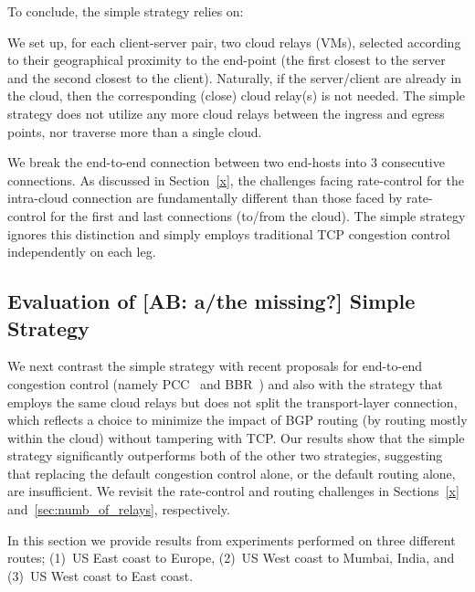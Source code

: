 \documentclass[10pt,sigconf]{acmart}
\newcommand{\mycomm}[3]{{\color{#2} \textbf{[#1: #3]}}}
\newcommand{\mycomm}[3]{}
\newcommand{\AB}[1]{\mycomm{AB}{orange}{#1}}
\begin{document}
To conclude, the simple strategy relies on:

\vspace{0.1in} We set up, for each client-server pair, two cloud relays (VMs), selected according to their geographical proximity to the end-point (the first closest to the server and the second closest to the client). Naturally, if the server/client are already in the cloud, then the corresponding (close) cloud relay(s) is not needed. The simple strategy does not utilize any more cloud relays between the ingress and egress points, nor traverse more than a single cloud.

\vspace{0.1in} We break the end-to-end connection between two end-hosts into $3$ consecutive connections. As discussed in Section~\ref{x}, the challenges facing rate-control for the intra-cloud connection are fundamentally different than those faced by rate-control for the first and last connections (to/from the cloud). The simple strategy ignores this distinction and simply employs traditional TCP congestion control independently on each leg.

\subsection{Evaluation of \AB{a/the missing?} Simple Strategy}

We next contrast the simple strategy with recent proposals for end-to-end congestion control (namely PCC~\cite{PCC} and BBR~\cite{BBR}) and also with the strategy that employs the same cloud relays but does not split the transport-layer connection, which reflects a choice to minimize the impact of BGP routing (by routing mostly within the cloud) without tampering with TCP. Our results show that the simple strategy significantly outperforms both of the other two strategies, suggesting that replacing the default congestion control alone, or the default routing alone, are insufficient. We revisit the rate-control and routing challenges in Sections~\ref{x} and~\ref{sec:numb_of_relays}, respectively.


\vspace{0.1in} 
In this section we provide results from experiments performed on three different routes; (1)~US East coast to Europe, (2)~US West coast to Mumbai, India, and (3)~US West coast to East coast. 
\end{document}
